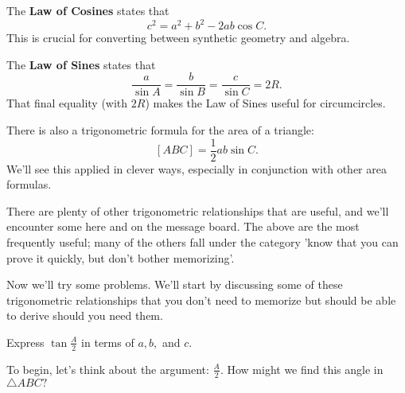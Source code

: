 The \textbf{Law of Cosines} states that $$c^2 = a^2 + b^2 - 2ab\cos{C}.$$ This is crucial for converting between synthetic geometry and algebra.

The \textbf{Law of Sines} states that $$\frac{a}{\sin{A}} = \frac{b}{\sin{B}} = \frac{c}{\sin{C}} = 2R.$$ That final equality (with $2R$) makes the Law of Sines useful for circumcircles.

There is also a trigonometric formula for the area of a triangle: $$[ABC] = \frac{1}{2}ab\sin{C}.$$ We'll see this applied in clever ways, especially in conjunction with other area formulas.

There are plenty of other trigonometric relationships that are useful, and we'll encounter some here and on the message board.  The above are the most frequently useful; many of the others fall under the category 'know that you can prove it quickly, but don't bother memorizing'.

Now we'll try some problems.  We'll start by discussing some of these trigonometric relationships that you don't need to memorize but should be able to derive should you need them.

\begin{example}
Express $\displaystyle \tan{\frac{A}{2}}$ in terms of $a,b,$ and $c.$    
\end{example}

To begin, let's think about the argument: $\displaystyle \tfrac{A}{2}.$ How might we find this angle in $\triangle ABC?$






